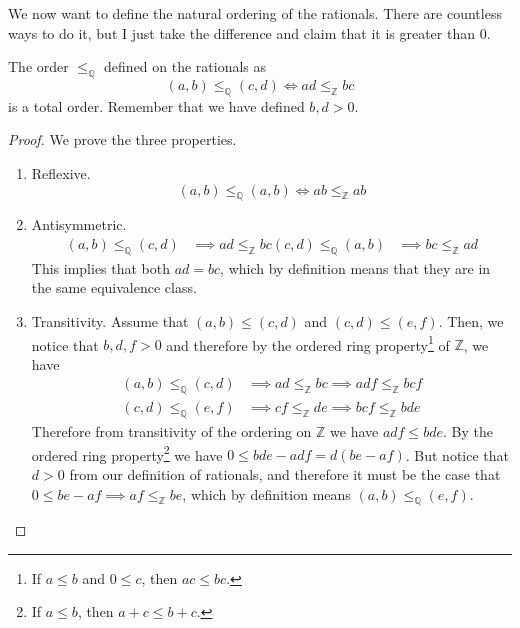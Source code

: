     We now want to define the natural ordering of the rationals. There are countless ways to do it, but I just take the difference and claim that it is greater than $0$. 

    \begin{theorem}
      The order $\leq_{\mathbb{Q}}$ defined on the rationals as 
      \begin{equation}
        (a, b) \leq_{\mathbb{Q}} (c, d) \iff ad \leq_{\mathbb{Z}} bc
      \end{equation}
      is a total order. Remember that we have defined $b, d > 0$. 
    \end{theorem}
    \begin{proof}
      We prove the three properties. 
      \begin{enumerate}
        \item Reflexive. 
        \begin{equation}
          (a, b) \leq_{\mathbb{Q}} (a, b) \iff ab \leq_{\mathbb{Z}} ab
        \end{equation} 

        \item Antisymmetric. 
        \begin{align}
          (a, b) \leq_{\mathbb{Q}} (c, d) & \implies ad \leq_{\mathbb{Z}} bc
          (c, d) \leq_{\mathbb{Q}} (a, b) & \implies bc \leq_{\mathbb{Z}} ad
        \end{align} 
        This implies that both $ad = bc$, which by definition means that they are in the same equivalence class. 

        \item Transitivity. Assume that $(a, b) \leq (c, d)$ and $(c, d) \leq (e, f)$. Then, we notice that $b, d, f > 0$ and therefore by the ordered ring property\footnote{If $a \leq b$ and $0 \leq c$, then $ac \leq bc$.} of $\mathbb{Z}$, we have 
        \begin{align}
          (a, b) \leq_{\mathbb{Q}} (c, d) & \implies ad \leq_{\mathbb{Z}} bc \implies adf \leq_{\mathbb{Z}} bcf \\ 
          (c, d) \leq_{\mathbb{Q}} (e, f) & \implies cf \leq_{\mathbb{Z}} de \implies bcf \leq_{\mathbb{Z}} bde
        \end{align}
        Therefore from transitivity of the ordering on $\mathbb{Z}$ we have $adf \leq bde$. By the ordered ring property\footnote{If $a \leq b$, then $a + c \leq b + c$.}  we have $0 \leq bde - adf = d(be - af)$. But notice that $d > 0$ from our definition of rationals, and therefore it must be the case that $0 \leq be - af \implies af \leq_{\mathbb{Z}} be$, which by definition means $(a, b) \leq_{\mathbb{Q}} (e, f)$. 
      \end{enumerate}
    \end{proof} 

